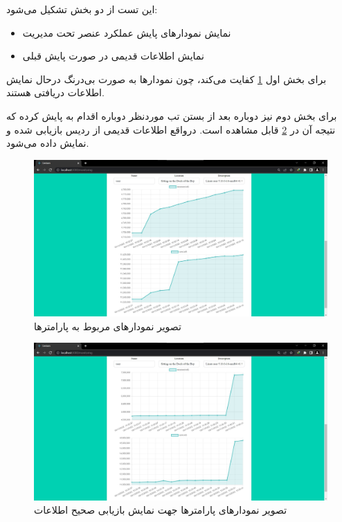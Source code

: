 این تست از دو بخش تشکیل می‌شود:

\begin{itemize}
    \item نمایش نمودارهای پایش عملکرد عنصر تحت مدیریت
    \item نمایش اطلاعات قدیمی در صورت پایش قبلی
\end{itemize}

برای بخش اول \cref{fig.53} کفایت می‌کند، چون نمودارها به صورت بی‌درنگ درحال نمایش اطلاعات دریافتی هستند.


برای بخش دوم نیز دوباره بعد از بستن تب موردنظر دوباره اقدام به پایش کرده که نتیجه آن در \cref{fig.54} قابل مشاهده است. درواقع اطلاعات قدیمی از ردیس بازیابی شده و نمایش داده می‌شود.


\begin{figure}[!h]
    \centering\includegraphics[scale=.38]{./monitoring-before}
    \caption{تصویر نمودارهای مربوط به پارامترها}\label{fig.53}
\end{figure}


\begin{figure}[!h]
    \centering\includegraphics[scale=.38]{./monitoring-after}
    \caption{تصویر نمودارهای پارامترها جهت نمایش بازیابی صحیح اطلاعات}\label{fig.54}
\end{figure}

